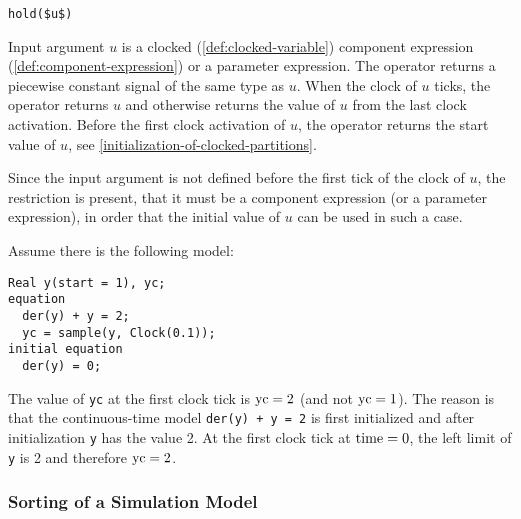 \begin{operatordefinition}[hold]
\begin{synopsis}\begin{lstlisting}
hold($u$)
\end{lstlisting}\end{synopsis}
\begin{semantics}
Input argument $u$ is a clocked (\cref{def:clocked-variable}) component expression (\cref{def:component-expression}) or a parameter expression.
The operator returns a piecewise constant signal of the same type as $u$.
When the clock of $u$ ticks, the operator returns $u$ and otherwise returns the value of $u$ from the last clock activation.
Before the first clock activation of $u$, the operator returns the start value of $u$, see \cref{initialization-of-clocked-partitions}.
\begin{nonnormative}
Since the input argument is not defined before the first tick of the clock of $u$, the restriction is present, that it must be a component expression (or a parameter expression), in order that the initial value of $u$ can be used in such a case.
\end{nonnormative}
\end{semantics}
\end{operatordefinition}

\begin{example}
Assume there is the following model:
\begin{lstlisting}[language=modelica]
  Real y(start = 1), yc;
equation
  der(y) + y = 2;
  yc = sample(y, Clock(0.1));
initial equation
  der(y) = 0;
\end{lstlisting}

The value of \lstinline!yc! at the first clock tick is $\text{\lstinline!yc!} = 2$ (and not $\text{\lstinline!yc!} = 1$).
The reason is that the continuous-time model \lstinline!der(y) + y = 2! is first initialized and after initialization \lstinline!y! has the value 2.
At the first clock tick at $\text{\lstinline!time!} = 0$, the left limit of \lstinline!y! is 2 and therefore $\text{\lstinline!yc!} = 2$.
\end{example}

\subsubsection{Sorting of a Simulation Model}


